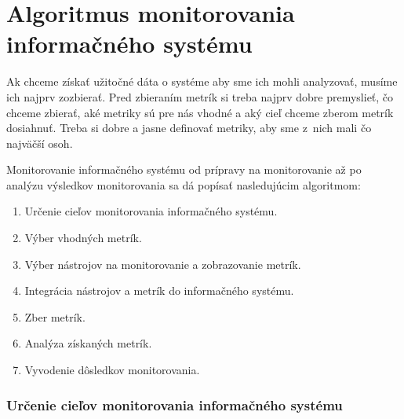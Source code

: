 \documentclass[a4paper, upjsfrontpage, disablespecwarning, thesismargins, thesislinespacing]{rnthesis}
\begin{document}


\chapter{Algoritmus monitorovania informačného systému}

Ak chceme získať užitočné dáta o systéme aby sme ich mohli analyzovať, musíme ich najprv zozbierať.
Pred zbieraním metrík si treba najprv dobre premyslieť, čo chceme zbierať, 
aké metriky sú pre nás vhodné a aký cieľ chceme zberom metrík dosiahnuť.
Treba si dobre a jasne definovať metriky, aby sme z~nich mali čo najväčší osoh.


Monitorovanie informačného systému od prípravy na monitorovanie až po analýzu výsledkov monitorovania sa dá popísať nasledujúcim algoritmom:

\begin{enumerate}
	\item Určenie cieľov monitorovania informačného systému.
	\item Výber vhodných metrík.
	\item Výber nástrojov na monitorovanie a zobrazovanie metrík.
	\item Integrácia nástrojov a metrík do informačného systému.
	\item Zber metrík.
	\item Analýza získaných metrík.
	\item Vyvodenie dôsledkov monitorovania.
\end{enumerate}

\subsection*{Určenie cieľov monitorovania informačného systému}
\end{document}
